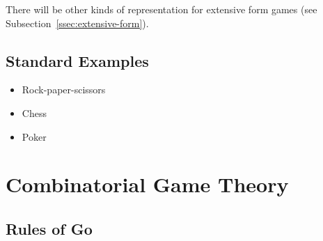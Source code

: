 There will be other kinds of representation for extensive form games (see Subsection~\ref{ssec:extensive-form}).

\subsection{Standard Examples}

\todo %

\begin{itemize}
  \item{Rock-paper-scissors}
  \item{Chess}
  \item{Poker}
\end{itemize}

\section{Combinatorial Game Theory}

\todo

\subsection{Rules of Go}
\label{ssec:rules-Go}

